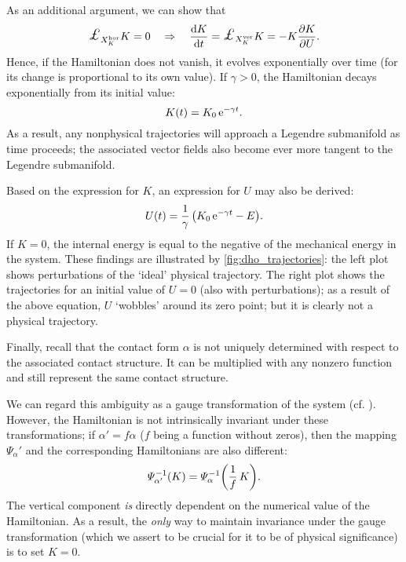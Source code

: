 As an additional argument, we can show that
\begin{equation}
     \lied{X^{\text{hor}}_K}{K} = 0 \quad \Rightarrow \quad \dv{K}{t} = \lied{X^{\text{ver}}_K}{K} = -K\pdv{K}{U}.
\end{equation}
Hence, if the Hamiltonian does not vanish, it evolves exponentially over time (for its change is proportional to its own value). If \(\gamma > 0\), the Hamiltonian decays exponentially from its initial value:
\begin{equation} 
    K(t) = K_0\,\mathrm{e}^{-\gamma t}.
    \label{eq:contact_ham_growth}
\end{equation}
As a result, any nonphysical trajectories will approach a Legendre submanifold as time proceeds; the associated vector fields also become ever more tangent to the Legendre submanifold. 

Based on the expression for \(K\), an expression for \(U\) may also be derived:
\begin{equation}
     U(t) = \frac{1}{\gamma}\,\qty( K_0\,\mathrm{e}^{-\gamma t} - E ).
\end{equation}
If \(K = 0\), the internal energy is equal to the negative of the mechanical energy in the system. These findings are illustrated by \cref{fig:dho_trajectories}: the left plot shows perturbations of the `ideal' physical trajectory. The right plot shows the trajectories for an initial value of \(U = 0\) (also with perturbations); as a result of the above equation, \(U\) `wobbles' around its zero point; but it is clearly not a physical trajectory.

Finally, recall that the contact form \(\alpha\) is not uniquely determined with respect to the associated contact structure. It can be multiplied with any nonzero function and still represent the same contact structure.

We can regard this ambiguity as a gauge transformation of the system (cf. \citet{Balian2001}). However, the Hamiltonian is not intrinsically invariant under these transformations; if \( \alpha' = f \alpha \) (\(f\) being a function without zeros), then the mapping \(\Psi_\alpha'\) and the corresponding Hamiltonians are also different: \cite[p. 321]{Libermann1987} 
\begin{equation}
    \Psi^{-1}_{\alpha'}(K) = \Psi^{-1}_{\alpha}\qty(\frac{1}{f}\,K).
    \label{eq:contact_ham_scaling}
\end{equation}
The vertical component \emph{is} directly dependent on the numerical value of the Hamiltonian. As a result, the \emph{only} way to maintain invariance under the gauge transformation (which we assert to be crucial for it to be of physical significance) is to set \(K = 0\).

